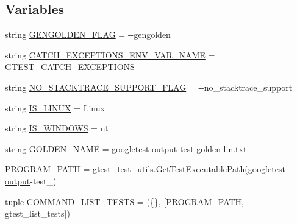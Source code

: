 \subsection*{Variables}
\begin{DoxyCompactItemize}
\item 
string \mbox{\hyperlink{namespacegoogletest-output-test_ad0d41196cc1dba894e54cd7129b5fc0a}{G\+E\+N\+G\+O\+L\+D\+E\+N\+\_\+\+F\+L\+AG}} = \textquotesingle{}-\/-\/gengolden\textquotesingle{}
\item 
string \mbox{\hyperlink{namespacegoogletest-output-test_ae6116e1d24bc75b7559e53353b8ee91c}{C\+A\+T\+C\+H\+\_\+\+E\+X\+C\+E\+P\+T\+I\+O\+N\+S\+\_\+\+E\+N\+V\+\_\+\+V\+A\+R\+\_\+\+N\+A\+ME}} = \textquotesingle{}G\+T\+E\+S\+T\+\_\+\+C\+A\+T\+C\+H\+\_\+\+E\+X\+C\+E\+P\+T\+I\+O\+NS\textquotesingle{}
\item 
string \mbox{\hyperlink{namespacegoogletest-output-test_aa5200b284ce09415c0061e96811cf24c}{N\+O\+\_\+\+S\+T\+A\+C\+K\+T\+R\+A\+C\+E\+\_\+\+S\+U\+P\+P\+O\+R\+T\+\_\+\+F\+L\+AG}} = \textquotesingle{}-\/-\/no\+\_\+stacktrace\+\_\+support\textquotesingle{}
\item 
string \mbox{\hyperlink{namespacegoogletest-output-test_a7ff614069cc92eea5943d720b479afd7}{I\+S\+\_\+\+L\+I\+N\+UX}} = \textquotesingle{}Linux\textquotesingle{}
\item 
string \mbox{\hyperlink{namespacegoogletest-output-test_a88183ad6c50d9f025ab11d07e5b4d9ec}{I\+S\+\_\+\+W\+I\+N\+D\+O\+WS}} = \textquotesingle{}nt\textquotesingle{}
\item 
string \mbox{\hyperlink{namespacegoogletest-output-test_a66b45fb215424c968b479fbf864f1e7f}{G\+O\+L\+D\+E\+N\+\_\+\+N\+A\+ME}} = \textquotesingle{}googletest-\/\mbox{\hyperlink{namespacegoogletest-output-test_ab3df9ce09186215a36c30454cf282417}{output}}-\/\mbox{\hyperlink{_mutual_8h_a707ee03719e99670bf6cfdfd897b8456}{test}}-\/golden-\/lin.\+txt\textquotesingle{}
\item 
\mbox{\hyperlink{namespacegoogletest-output-test_a36302384d49a636defe86704a422acb2}{P\+R\+O\+G\+R\+A\+M\+\_\+\+P\+A\+TH}} = \mbox{\hyperlink{namespacegtest__test__utils_a89ed3717984a80ffbb7a9c92f71b86a2}{gtest\+\_\+test\+\_\+utils.\+Get\+Test\+Executable\+Path}}(\textquotesingle{}googletest-\/\mbox{\hyperlink{namespacegoogletest-output-test_ab3df9ce09186215a36c30454cf282417}{output}}-\/test\+\_\+\textquotesingle{})
\item 
tuple \mbox{\hyperlink{namespacegoogletest-output-test_accb05a0a5c9b083723186bb6116f928f}{C\+O\+M\+M\+A\+N\+D\+\_\+\+L\+I\+S\+T\+\_\+\+T\+E\+S\+TS}} = (\{\}, \mbox{[}\mbox{\hyperlink{namespacegoogletest-output-test_a36302384d49a636defe86704a422acb2}{P\+R\+O\+G\+R\+A\+M\+\_\+\+P\+A\+TH}}, \textquotesingle{}-\/-\/gtest\+\_\+list\+\_\+tests\textquotesingle{}\mbox{]})

\end{DoxyCompactItemize}
